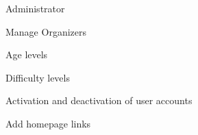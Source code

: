 
\begin{section}{Administrator}

    \begin{subsection}{Manage Organizers}
    
    
		
    
    \end{subsection}
    
    \begin{subsection}{Age levels}
    
    
    \end{subsection}
    
    \begin{subsection}{Difficulty levels}
    
    
    \end{subsection}
    
    \begin{subsection}{Activation and deactivation of user accounts}
    
    \end{subsection}
    
    \begin{subsection}{Add homepage links}
    
    \end{subsection}

\end{section}

